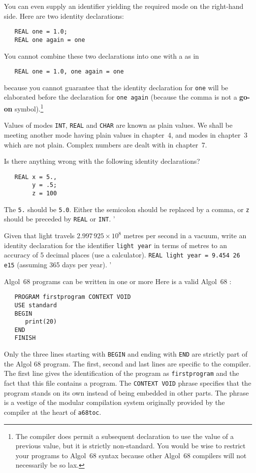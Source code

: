 You can even supply an identifier yielding the required mode on the
right-hand side. Here are two identity declarations:
\begin{verbatim}
   REAL one = 1.0;
   REAL one again = one
\end{verbatim}
\noindent
You cannot combine these two declarations into one with a 
as in
\begin{verbatim}
   REAL one = 1.0, one again = one
\end{verbatim}
\noindent
because you cannot guarantee that the identity declaration for
\verb|one| will be elaborated before the declaration for
\verb|one again| (because the comma is not a \textbf{go-on}
symbol).\footnote{The \protect{}
compiler does permit a subsequent declaration to use the value of a
previous value, but it is strictly non-standard. You would be wise to
restrict your programs to Algol~68 syntax because other Algol~68
compilers will not necessarily be so lax.}

Values of modes \verb|INT|, \verb|REAL| and \verb|CHAR| are known as
plain values. We shall be meeting another mode having plain values in
chapter~4, and modes in chapter~3 which are not plain.  Complex
numbers are dealt with in chapter~7.
\newpage

\begin{exercise}
\item Is there anything wrong with the following identity
declarations?
\begin{verbatim}
   REAL x = 5.,
        y = .5;
        z = 100
\end{verbatim}
\indent\ans The \verb|5.| should be \verb|5.0|. Either the semicolon
should be replaced by a comma, or \verb|z| should be preceded by
\verb|REAL| or \verb|INT|.
'
\item Given that light travels $2.997\,925\times10^8$ metres per
second in a vacuum, write an identity declaration for the identifier
\verb|light year| in terms of metres to an accuracy of 5 decimal
places (use a calculator).
\ans \verb|REAL light year = 9.454 26 e15|\newline
(assuming 365 days per year).
'
\end{exercise}

Algol~68 programs can be written in one or more
 Here is a valid Algol~68
:
\begin{verbatim}
   PROGRAM firstprogram CONTEXT VOID
   USE standard
   BEGIN
      print(20)
   END
   FINISH
\end{verbatim}
\noindent
Only the three lines starting with \verb|BEGIN| and ending with
\verb|END| are strictly part of the Algol 68 program. The first,
second and last lines are specific to the
 compiler. The
first line gives the identification of the program as
\texttt{firstprogram} and the fact that this file contains a program.
The \verb|CONTEXT VOID| phrase specifies that the program stands on
its own instead of being embedded in other parts. The phrase is a
vestige of the modular compilation system originally provided by the
compiler at the heart of \verb|a68toc|.

